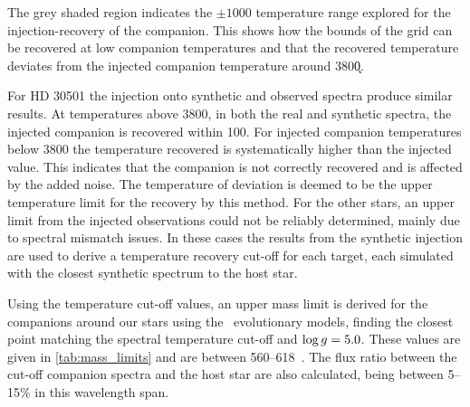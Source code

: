 The grey shaded region indicates the \(\pm 1000\)\K{} temperature range explored for the injection-recovery of the companion.
This shows how the bounds of the grid can be recovered at low companion temperatures and that the recovered temperature deviates from the injected companion temperature around 3800\k{}.

For {HD 30501} the injection onto synthetic and observed spectra produce similar results.
At temperatures above 3800\K{}, in both the real and synthetic spectra, the injected companion is recovered within 100\K{}.
For injected companion temperatures below 3800\K{} the temperature recovered is systematically higher than the injected value.
This indicates that the companion is not correctly recovered and is affected by the added noise.
The temperature of deviation is deemed to be the upper temperature limit for the recovery by this method.
For the other stars, an upper limit from the injected observations could not be reliably determined, mainly due to spectral mismatch issues.
In these cases the results from the synthetic injection are used to derive a temperature recovery cut-off for each target, each simulated with the closest synthetic spectrum to the host star.

Using the temperature cut-off values, an upper mass limit is derived for the companions around our stars using the~\citet{baraffe_new_2015} evolutionary models, finding the closest point matching the spectral temperature cut-off and \(\log{g}{}=5.0\).
These values are given in \cref{tab:mass_limits} and are between 560--618~\Mjup{}.
The flux ratio between the cut-off companion spectra and the host star are also calculated, being between 5--15\% in this wavelength span.



